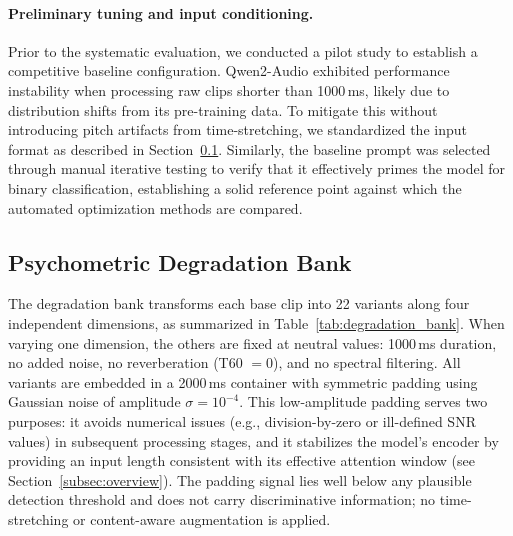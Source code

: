 \documentclass[11pt,a4paper]{article}
\begin{document}
\paragraph{Preliminary tuning and input conditioning.} Prior to the systematic evaluation, we conducted a pilot study to establish a competitive baseline configuration. Qwen2-Audio exhibited performance instability when processing raw clips shorter than 1000\,ms, likely due to distribution shifts from its pre-training data. To mitigate this without introducing pitch artifacts from time-stretching, we standardized the input format as described in Section~\ref{subsec:degradation_bank}. Similarly, the baseline prompt was selected through manual iterative testing to verify that it effectively primes the model for binary classification, establishing a solid reference point against which the automated optimization methods are compared.

\subsection{Psychometric Degradation Bank}
\label{subsec:degradation_bank}

The degradation bank transforms each base clip into 22 variants along four independent dimensions, as summarized in Table~\ref{tab:degradation_bank}. When varying one dimension, the others are fixed at neutral values: 1000\,ms duration, no added noise, no reverberation (T60 $= 0$), and no spectral filtering. All variants are embedded in a 2000\,ms container with symmetric padding using Gaussian noise of amplitude $\sigma = 10^{-4}$. This low-amplitude padding serves two purposes: it avoids numerical issues (e.g., division-by-zero or ill-defined SNR values) in subsequent processing stages, and it stabilizes the model's encoder by providing an input length consistent with its effective attention window (see Section~\ref{subsec:overview}). The padding signal lies well below any plausible detection threshold and does not carry discriminative information; no time-stretching or content-aware augmentation is applied.
\end{document}
